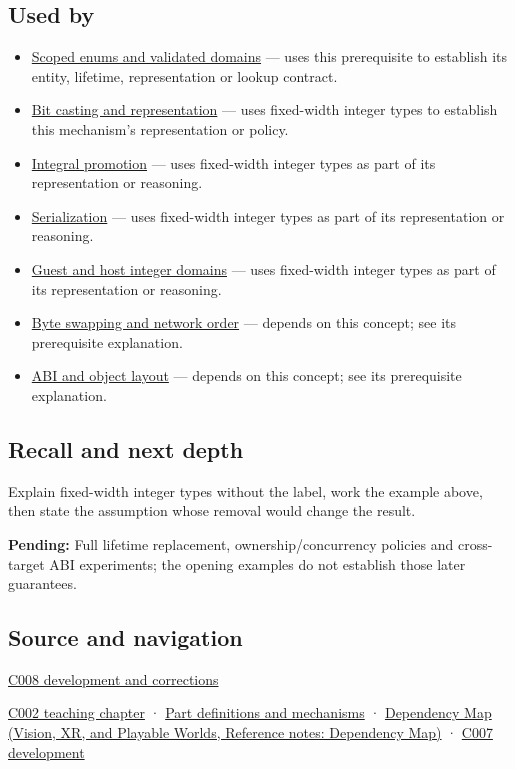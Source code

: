 \subsection{Used by}\label{appendix-cc04044b5782-used-by}

\begin{itemize}
\tightlist
\item
  \hyperref[appendix-23640fcee147]{Scoped enums and validated domains} --- uses this prerequisite to establish its entity, lifetime, representation or lookup contract.
\item
  \hyperref[appendix-34ee45f161c1]{Bit casting and representation} --- uses fixed-width integer types to establish this mechanism's representation or policy.
\item
  \hyperref[appendix-45303d03796a]{Integral promotion} --- uses fixed-width integer types as part of its representation or reasoning.
\item
  \hyperref[appendix-91d09ebed979]{Serialization} --- uses fixed-width integer types as part of its representation or reasoning.
\item
  \hyperref[appendix-33e7a011b684]{Guest and host integer domains} --- uses fixed-width integer types as part of its representation or reasoning.
\item
  \hyperref[appendix-11ba36693aa2]{Byte swapping and network order} --- depends on this concept; see its prerequisite explanation.
\item
  \hyperref[appendix-c4ac6bb0fff8]{ABI and object layout} --- depends on this concept; see its prerequisite explanation.
\end{itemize}

\subsection{Recall and next depth}\label{appendix-cc04044b5782-recall-and-next-depth}

Explain fixed-width integer types without the label, work the example above, then state the assumption whose removal would change the result.

\textbf{Pending:} Full lifetime replacement, ownership/concurrency policies and cross-target ABI experiments; the opening examples do not establish those later guarantees.

\subsection{Source and navigation}\label{appendix-cc04044b5782-source-and-navigation}

\hyperref[appendix-fd090d982a15-m008---parts-113-126]{C008 development and corrections}

\hyperref[01-foundations-i-ch001-arithmetic-becomes-a-policy]{C002 teaching chapter} · \hyperref[appendix-fd090d982a15]{Part definitions and mechanisms} · \href{../07-Vision-XR-and-Playable-Worlds/main.pdf\#nameddest=appendix-4ad47bdd269a}{Dependency Map (Vision, XR, and Playable Worlds, Reference notes: Dependency Map)} · \hyperref[01-foundations-i-ch002-choose-a-type-for-its-promise-not-its-familiar-size]{C007 development}
